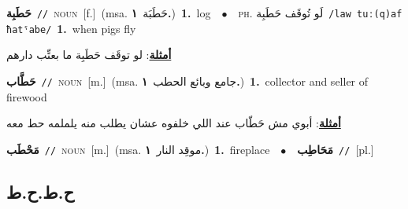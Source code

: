 \documentclass[10pt,a4paper,twoside]{article} %
\begin{document}
\begin{multicols}{2}
{\setlength\topsep{0pt}\textbf{\foreignlanguage{arabic}{حَطَبِة}}\ {\color{gray}\texttt{//}\color{black}}\ \textsc{noun}\ [f.]\ \color{gray}(msa. \foreignlanguage{arabic}{حَطَبَة}~\foreignlanguage{arabic}{\textbf{١.}})\color{black}\ \textbf{1.}~log\ \ $\bullet$\ \ \textsc{ph.} \color{gray} \foreignlanguage{arabic}{لَو تُوقَف حَطَبِة}\color{black}\ {\color{gray}\texttt{/{\sffamily law tuː(q)af ħatˤabe}/}\color{black}}\ \textbf{1.}~when pigs fly\  \begin{flushright}\color{gray}\foreignlanguage{arabic}{\textbf{\underline{\foreignlanguage{arabic}{أمثلة}}}: لو توقَف حَطَبِة ما بعتِّب دارهم}\end{flushright}\color{black}} \vspace{2mm}

{\setlength\topsep{0pt}\textbf{\foreignlanguage{arabic}{حَطَّاب}}\ {\color{gray}\texttt{//}\color{black}}\ \textsc{noun}\ [m.]\ \color{gray}(msa. \foreignlanguage{arabic}{جامع وبائع الحطب}~\foreignlanguage{arabic}{\textbf{١.}})\color{black}\ \textbf{1.}~collector and seller of firewood\  \begin{flushright}\color{gray}\foreignlanguage{arabic}{\textbf{\underline{\foreignlanguage{arabic}{أمثلة}}}: أبوي مش حَطّاب عند اللي خلفوه عشان يطلب منه يلملمه حط معه}\end{flushright}\color{black}} \vspace{2mm}

{\setlength\topsep{0pt}\textbf{\foreignlanguage{arabic}{مَحْطَب}}\ {\color{gray}\texttt{//}\color{black}}\ \textsc{noun}\ [m.]\ \color{gray}(msa. \foreignlanguage{arabic}{موقِد النار}~\foreignlanguage{arabic}{\textbf{١.}})\color{black}\ \textbf{1.}~fireplace\ \ $\bullet$\ \ \setlength\topsep{0pt}\textbf{\foreignlanguage{arabic}{مَحَاطِب}}\ {\color{gray}\texttt{//}\color{black}}\ [pl.]\ } \vspace{2mm}

\vspace{-3mm}
\subsection*{\color{blue}\foreignlanguage{arabic}{ح.ط.ح.ط}\color{blue}{}} 


\end{multicols}
\end{document}
